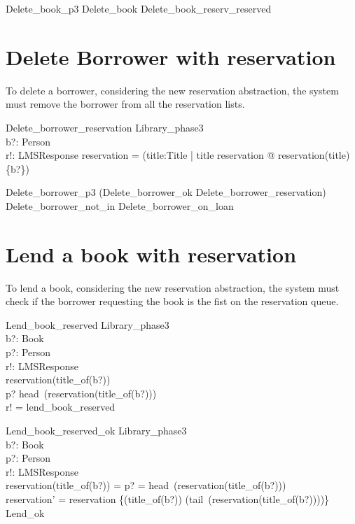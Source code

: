 \documentclass[11pt, fuzz]{article}
\begin{document}
\begin{zed}
    Delete\_book\_p3  Delete\_book \lor Delete\_book\_reserv\_reserved
\end{zed}

\section{Delete Borrower with reservation}

To delete a borrower, considering the new reservation abstraction, the system must remove the borrower from all the reservation lists. 

\begin{schema}{Delete\_borrower\_reservation}
    \Delta Library\_phase3 \\
    b?: Person             \\
    r!: LMSResponse 
\where
    reservation = (\lambda title:Title | title \in \dom reservation @ reservation(title) \filter \{b?\}) 
\end{schema}


\begin{zed}
Delete\_borrower\_p3  (Delete\_borrower\_ok \land Delete\_borrower\_reservation) \\ \lor Delete\_borrower\_not\_in \lor Delete\_borrower\_on\_loan
\end{zed}


\section{Lend a book with reservation}

To lend a book, considering the new reservation abstraction, the system must check if the borrower requesting the book is the fist on the reservation queue. 

\begin{schema}{Lend\_book\_reserved}
    \Xi Library\_phase3 \\
    b?: Book            \\
    p?: Person          \\
    r!: LMSResponse     \\
\where
    reservation(title\_of(b?)) \neq \emptyset \\
    p? \neq head~(reservation(title\_of(b?))) \\
    r! = lend\_book\_reserved
\end{schema}    

\begin{schema}{Lend\_book\_reserved\_ok}
    \Delta Library\_phase3 \\
    b?: Book               \\
    p?: Person             \\
    r!: LMSResponse        \\
\where    
    reservation(title\_of(b?)) = \emptyset \lor p? = head~(reservation(title\_of(b?))) \\
    reservation' = reservation \oplus \{(title\_of(b?)) \mapsto (tail~(reservation(title\_of(b?))))\} \\
    Lend\_ok               
\end{schema}
\end{document}
